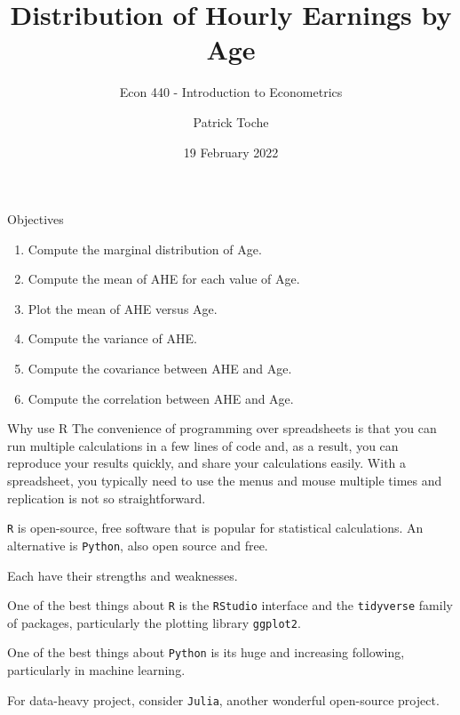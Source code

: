 \documentclass[
  11pt,
  ignorenonframetext,
  svgnames, handout, t]{beamer}
\title{Distribution of Hourly Earnings by Age}
\subtitle{Econ 440 - Introduction to Econometrics}
\author{Patrick Toche}
\date{19 February 2022}
\providecommand{\tightlist}{%
  \setlength{\itemsep}{0pt}\setlength{\parskip}{0pt}}
\begin{document}
\frame{\titlepage}

\begin{frame}{Objectives}
\protect\hypertarget{objectives}{}
\begin{enumerate}
\tightlist
\item
  Compute the marginal distribution of Age.
\item
  Compute the mean of AHE for each value of Age.
\item
  Plot the mean of AHE versus Age.
\item
  Compute the variance of AHE.
\item
  Compute the covariance between AHE and Age.
\item
  Compute the correlation between AHE and Age.
\end{enumerate}
\end{frame}

\begin{frame}[fragile]{Why use R}
\protect\hypertarget{why-use-r}{}
The convenience of programming over spreadsheets is that you can run
multiple calculations in a few lines of code and, as a result, you can
reproduce your results quickly, and share your calculations easily. With
a spreadsheet, you typically need to use the menus and mouse multiple
times and replication is not so straightforward.

\texttt{R} is open-source, free software that is popular for statistical
calculations. An alternative is \texttt{Python}, also open source and
free.

Each have their strengths and weaknesses.

One of the best things about \texttt{R} is the \texttt{RStudio}
interface and the \texttt{tidyverse} family of packages, particularly
the plotting library \texttt{ggplot2}.

One of the best things about \texttt{Python} is its huge and increasing
following, particularly in machine learning.

For data-heavy project, consider \texttt{Julia}, another wonderful
open-source project.
\end{frame}
\end{document}
